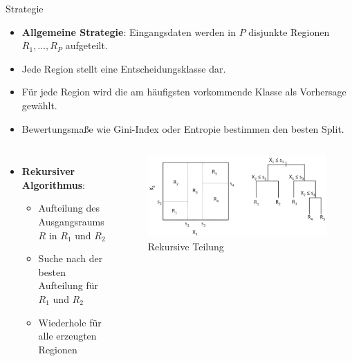 \documentclass{beamer}
\begin{document}
\begin{frame}{Strategie}
	\begin{itemize}
		\item{\textbf{Allgemeine Strategie}: Eingangsdaten werden in $P$ disjunkte Regionen $R_1,\dots,R_P$ aufgeteilt.}
		\item{Jede Region stellt eine Entscheidungsklasse dar.}
		\item{Für jede Region wird die am häufigsten vorkommende Klasse als Vorhersage gewählt.}
		\item{Bewertungsmaße wie Gini-Index oder Entropie bestimmen den besten Split.}
	\end{itemize}
	
	\begin{columns}
			\begin{itemize}
				\item{\textbf{Rekursiver Algorithmus}:}
				\begin{itemize}
					\item {Aufteilung des Ausgangsraums $R$ in $R_1$ und $R_2$}
					\item{Suche nach der besten Aufteilung für $R_1$ und $R_2$}
					\item{Wiederhole für alle erzeugten Regionen}
				\end{itemize}
			\end{itemize}
			
			\begin{figure}
				\includegraphics[width=\linewidth]{Images/split.png}
				\caption{Rekursive Teilung \cite{hastie_tibshirani_friedman}}
			\end{figure}
	\end{columns}
	
\end{frame}
\end{document}

